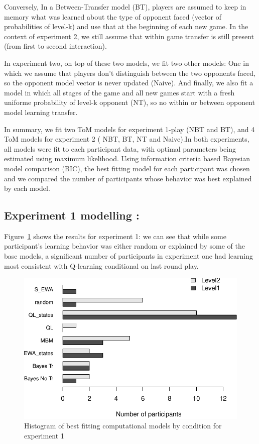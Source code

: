 \documentclass[man,floatsintext]{apa6}
\begin{document}
Conversely, In a Between-Transfer model (BT), players are assumed to keep in memory what was learned about the type of opponent faced (vector of probabilities of level-k) and use that at the beginning of each new game. In the context of experiment 2, we still assume that within game transfer is still present (from first to second interaction).

In experiment two, on top of these two models, we fit two other models: One in which we assume that players don't distinguish between the two opponents faced, so the opponent model vector is never updated (Naive). And finally, we also fit a model in which all stages of the game and all new games start with a fresh uniforme probability of level-k opponent (NT), so no within or between opponent model learning transfer.

In summary, we fit two ToM models for experiment 1-play (NBT and BT), and 4 ToM models for experiment 2 ( NBT, BT, NT and Naive).In both experiments, all models were fit to each participant data, with optimal parameters being estimated using maximum likelihood. Using information criteria based Bayesian model comparison (BIC), the best fitting model for each participant was chosen and we compared the number of participants whose behavior was best explained by each model.

\hypertarget{experiment-1-modelling}{%
\subsection{Experiment 1 modelling :}\label{experiment-1-modelling}}

Figure~\ref{fig:exp1-comp-models} shows the results for experiment 1: we can see that while some participant's learning behavior was either random or explained by some of the base models, a significant number of participants in experiment one had learning most consistent with Q-learning conditional on last round play.

\begin{figure}

{\centering \includegraphics{draft_report_v1_files/figure-latex/exp1-comp-models-1} 

}

\caption{Histogram of best fitting computational models by condition for experiment 1}\label{fig:exp1-comp-models}
\end{figure}
\end{document}
